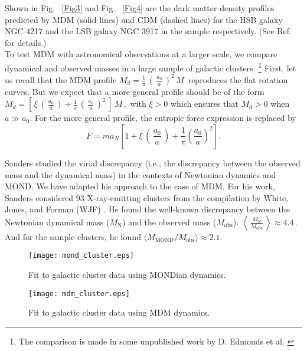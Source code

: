 \documentclass[a4paper]{jpconf}
\begin{document}
Shown in Fig. ~\ref{Fig3} and Fig. ~\ref{Fig4} are the dark matter 
density
profiles predicted by MDM (solid lines) and CDM (dashed lines) for
the HSB galaxy NGC 4217 and the LSB galaxy NGC 3917 in the sample 
respectively.
(See Ref. \cite{Edm1} for details.)\\

To test MDM with astronomical observations at a larger scale, we 
compare dynamical and observed masses in a large sample of galactic clusters. 
\footnote{The comparison is made in some unpublished work by D. Edmonds et al. 
\cite{Edm1}}
First, let us recall that
the MDM profile $M_d = \frac{1}{\pi}\,\left(\,\frac{a_0}{a}\,\right)^2\, M\,$
reproduces the flat rotation curves.  But
we expect that a more general profile should be of
the form
$
M_d = \left[\,\xi\,\left(\,\frac{a_0}{a}\,\right)+\frac{1}{\pi}\,
\left(\,\frac{a_0}{a}\,\right)^2\,\right] \, M\,,
$
with $\xi >0$ which ensures that $M_d > 0$ when $a \gg a_0$.
For the more general profile, the entropic force expression
is replaced by
\begin{equation}
F = m a_N \left[ 1 + \xi\,\left(\,\frac{a_0}{a}\,\right)+
\frac{1}{\pi} \left( \frac{a_0}{a} \right)^2 \right].
\label{force3}
\end{equation}


Sanders \cite{Sanders1999} studied the virial discrepancy (i.e.,
the discrepancy between the observed mass and the dynamical mass) in the 
contexts of Newtonian dynamics and MOND.  We \cite{Edm1} have adapted his 
approach to the case of MDM. For his work,
Sanders considered 93 X-ray-emitting clusters from the compilation
by White, Jones, and Forman (WJF) \cite{FJW1997}.
He found the well-known discrepancy
between the Newtonian dynamical mass ($M_{\textrm{N} }$) and the observed mass 
($M_{\textrm{obs} }$):
$
\left \langle \, \frac{M_\textrm{N}}{ M_{\textrm{obs} }} \,\right \rangle 
\approx 4.4\,.
$
And for the sample clusters, he found $\langle M_{\textrm{MOND}} / 
M_{\textrm{obs}} \rangle \approx 2.1.$\\


\begin{figure}[h]
\begin{minipage}{16pc}
\texttt{[image: mond\_cluster.eps]}
\caption{\label{Fig5}Fit to galactic cluster data using
MONDian dynamics.}
\end{minipage}\hspace{4pc}%
\begin{minipage}{16pc}
\texttt{[image: mdm\_cluster.eps]}
\caption{\label{Fig6}Fit to galactic cluster data using
MDM dynamics.}
\end{minipage} \end{figure}
\end{document}
